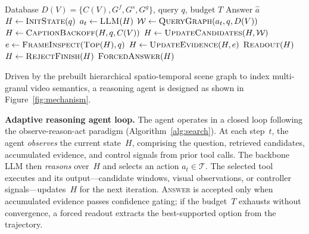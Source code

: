 \documentclass[sigconf, screen, review, anonymous]{acmart}
\begin{document}
\begin{algorithm}[!tb]
  \caption{SGDAgent: Graph-Driven Reasoning Loop}
  \label{alg:search}
  \begin{algorithmic}[1]
  \Require Database $D(V)=\{C(V), G^f, G^s, G^g\}$, query $q$,
    budget $T$
  \Ensure Answer $\hat{a}$
  \State $H \leftarrow \textsc{InitState}(q)$
      \State $a_t \leftarrow \textsc{LLM}(H)$
          \State $\mathcal{W} \leftarrow \textsc{QueryGraph}(a_t, q, D(V))$
              \State $H \leftarrow \textsc{CaptionBackoff}(H, q, C(V))$
          \Else
              \State $H \leftarrow \textsc{UpdateCandidates}(H, \mathcal{W})$
          \EndIf
          \State $e \leftarrow \textsc{FrameInspect}(\textsc{Top}(H), q)$
          \State $H \leftarrow \textsc{UpdateEvidence}(H, e)$
          \State \Return $\textsc{Readout}(H)$
      \Else
          \State $H \leftarrow \textsc{RejectFinish}(H)$
      \EndIf
  \EndFor
  \State \Return $\textsc{ForcedAnswer}(H)$
  \end{algorithmic}
  \end{algorithm}

Driven by the prebuilt hierarchical spatio-temporal scene graph to index multi-granul video semantics, a reasoning agent is designed as shown in Figure~\ref{fig:mechanism}. 

\textbf{Adaptive reasoning agent loop.}
The agent operates in a closed loop following the observe-reason-act
paradigm\cite{react2022} (Algorithm~\ref{alg:search}).
At each step~$t$, the agent \emph{observes} the current state~$H$,
comprising the question, retrieved candidates, accumulated evidence,
and control signals from prior tool calls.
The backbone LLM then \emph{reasons} over~$H$ and selects an action
$a_t \in \mathcal{T}$.
The selected tool executes and its output—candidate windows, visual
observations, or controller signals—updates~$H$ for the next
iteration.
\textsc{Answer} is accepted only when accumulated evidence passes
confidence gating; if the budget~$T$ exhausts without convergence, a
forced readout extracts the best-supported option from the trajectory.
\end{document}
